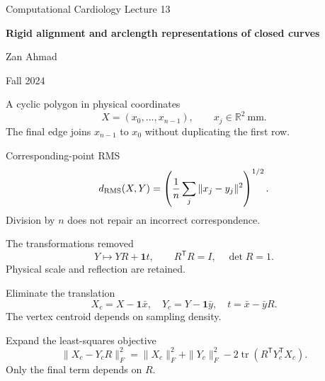 \documentclass[aspectratio=169,11pt]{beamer}
\newcommand{\notestarget}{notes.pdf}\newcommand{\noteslabel}{Notes}
\begin{document}
\begin{frame}[plain]\vfill
{\small\color{accent} Computational Cardiology \quad Lecture 13}\par\medskip
{\raggedright{}\LARGE\bfseries\color{ink} Rigid alignment and arclength representations of closed curves}\par\bigskip
Zan Ahmad\par\smallskip
{\small Fall 2024}\par\vfill\end{frame}
\renewcommand{\notestarget}{notes.pdf\#note-ordered-polygonal-representations}
\begin{frame}[t,fragile,label=slide-a-cyclic-polygon-in-physical-coordinates]{A cyclic polygon in physical coordinates}
\[X=(x_0,\ldots,x_{n-1}),\qquad x_j\in\mathbb R^2\ \mathrm{mm}.\]\pause{} The final edge joins $x_{n-1}$ to $x_0$ without duplicating the first row.
\end{frame}
\renewcommand{\notestarget}{notes.pdf\#note-physical-size-and-pose-invariance}
\begin{frame}[t,fragile,label=slide-corresponding-point-rms]{Corresponding-point RMS}
\[d_{\rm RMS}(X,Y)=\left(\frac1n\sum_j\|x_j-y_j\|^2\right)^{1/2}.\]\pause{} Division by $n$ does not repair an incorrect correspondence.
\end{frame}
\renewcommand{\notestarget}{notes.pdf\#note-physical-size-and-pose-invariance}
\begin{frame}[t,fragile,label=slide-the-transformations-removed]{The transformations removed}
\[Y\mapsto YR+\boldsymbol1t,\qquad R^{\mathsf T}R=I,\quad\det R=1.\]\pause{} Physical scale and reflection are retained.
\end{frame}
\renewcommand{\notestarget}{notes.pdf\#note-physical-size-and-pose-invariance}
\begin{frame}[t,fragile,label=slide-eliminate-the-translation]{Eliminate the translation}
\[X_c=X-\boldsymbol1\bar x,\quad Y_c=Y-\boldsymbol1\bar y,\quad t=\bar x-\bar yR.\]\pause{} The vertex centroid depends on sampling density.
\end{frame}
\renewcommand{\notestarget}{notes.pdf\#note-the-proper-orthogonal-procrustes-problem}
\begin{frame}[t,fragile,label=slide-expand-the-least-squares-objective]{Expand the least-squares objective}
\[\|X_c-Y_cR\|_F^2=\|X_c\|_F^2+\|Y_c\|_F^2-2\operatorname{tr}(R^{\mathsf T}Y_c^{\mathsf T}X_c).\]\pause{} Only the final term depends on $R$.
\end{frame}
\end{document}
